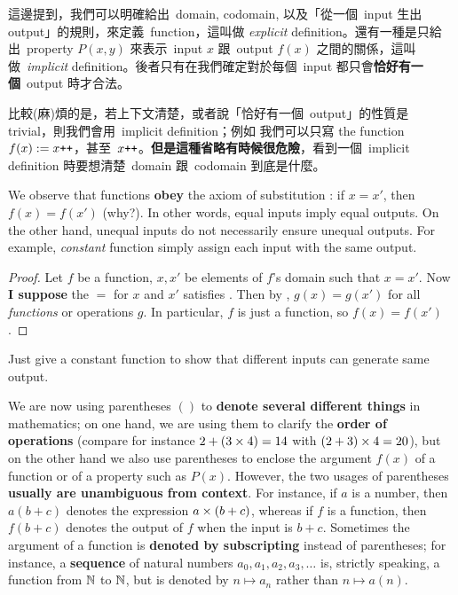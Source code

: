 \begin{note}
這邊提到，我們可以明確給出\ domain, codomain, 以及「從一個\ input 生出 output」的規則，來定義\ function，這叫做 \emph{explicit} definition。還有一種是只給出\ property \(P(x, y)\) 來表示\ input \(x\) 跟\ output \(f(x)\) 之間的關係，這叫做\ \emph{implicit} definition。後者只有在我們確定對於每個\ input 都只會\textbf{恰好有一個}\ output 時才合法。
\end{note}

\begin{note}
比較(麻)煩的是，若上下文清楚，或者說「恰好有一個\ output」的性質是 trivial，則我們會用\ implicit definition；例如  我們可以只寫 the function \(f(x) := x\texttt{++}\)，甚至\  \(x\texttt{++}\)。\textbf{但是這種省略有時候很危險}，看到一個\ implicit definition 時要想清楚\ domain 跟\ codomain 到底是什麼。
\end{note}

\begin{note}
We observe that functions \textbf{obey} the axiom of substitution : if \(x = x'\), then \(f(x)= f(x')\) (why?). In other words, equal inputs imply equal outputs. On the other hand, unequal inputs do not necessarily ensure unequal outputs. For example, \emph{constant} function simply assign each input with the same output.
\end{note}

\begin{proof}
Let \(f\) be a function, \(x, x'\) be elements of \(f\)'s domain such that \(x = x'\). Now \textbf{I suppose} the \(=\) for \(x\) and \(x'\) satisfies . Then by , \(g(x) = g(x')\) for all \emph{functions} or operations \(g\). In particular, \(f\) is just a function, so \(f(x) = f(x')\).
\end{proof}

\begin{example}
Just give a constant function to show that different inputs can generate same output.
\end{example}

\begin{remark} \label{remark 3.3.5}
We are now using parentheses \(()\) to \textbf{denote several different things} in mathematics; on one hand, we are using them to clarify the \textbf{order of operations} (compare for instance \(2 + (3 \times 4) = 14\) with \((2 + 3) \times 4 = 20\)), but on the other hand we also use parentheses to enclose the argument \(f(x)\) of a function or of a property such as \(P(x)\). However, the two usages of parentheses \textbf{usually are unambiguous from context}. For instance, if \(a\) is a number, then \(a(b + c)\) denotes the expression \(a \times (b + c)\), whereas if \(f\) is a function, then \(f(b + c)\) denotes the output of \(f\) when the input is \(b + c\). Sometimes the argument of a function is \textbf{denoted by subscripting} instead of parentheses; for instance, a \textbf{sequence} of natural numbers \(a_0, a_1, a_2, a_3, \dots\) is, strictly speaking, a function from \(\mathbb{N}\) to \(\mathbb{N}\), but is denoted by \(n \mapsto a_n\) rather than \(n \mapsto a(n)\).
\end{remark}

